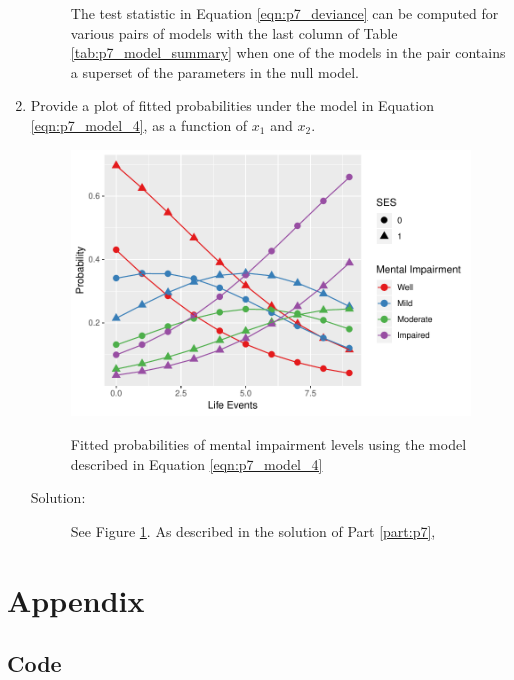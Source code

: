 \documentclass[letterpaper,11pt]{article}
\begin{document}
\begin{enumerate}
\begin{description}
    The test statistic in Equation \ref{eqn:p7_deviance} can be computed for
    various pairs of models with the last column of Table
    \ref{tab:p7_model_summary} when one of the models in the pair contains a
    superset of the parameters in the null model.
  \end{description}
\item Provide a plot of fitted probabilities under the model in Equation
  \ref{eqn:p7_model_4}, as a function of $x_1$ and $x_2$.

  \begin{figure}
    \centering
    \caption{Fitted probabilities of mental impairment levels using the model
      described in Equation \ref{eqn:p7_model_4}}
    \includegraphics{p8_fitted_probabilities.pdf}
    \label{fig:p8_fitted_probabilities}
  \end{figure}
  
  \begin{description}
  \item[Solution:] See Figure \ref{fig:p8_fitted_probabilities}. As described in
    the solution of Part \ref{part:p7},
  \end{description}
\end{enumerate}

\clearpage

\section*{Appendix}

\subsection*{Code}
\end{document}
